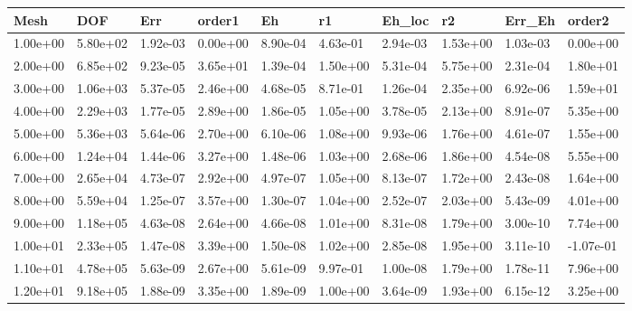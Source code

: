 \begin{tabular}{llllllllll}
Mesh & DOF & Err & order1 & Eh & r1 & Eh_loc & r2 & Err_Eh & order2 \\ 
\hline 
1.00e+00 & 5.80e+02 & 1.92e-03 & 0.00e+00 & 8.90e-04 & 4.63e-01 & 2.94e-03 & 1.53e+00 & 1.03e-03 &  0.00e+00 \\ 
2.00e+00 & 6.85e+02 & 9.23e-05 & 3.65e+01 & 1.39e-04 & 1.50e+00 & 5.31e-04 & 5.75e+00 & 2.31e-04 &  1.80e+01 \\ 
3.00e+00 & 1.06e+03 & 5.37e-05 & 2.46e+00 & 4.68e-05 & 8.71e-01 & 1.26e-04 & 2.35e+00 & 6.92e-06 &  1.59e+01 \\ 
4.00e+00 & 2.29e+03 & 1.77e-05 & 2.89e+00 & 1.86e-05 & 1.05e+00 & 3.78e-05 & 2.13e+00 & 8.91e-07 &  5.35e+00 \\ 
5.00e+00 & 5.36e+03 & 5.64e-06 & 2.70e+00 & 6.10e-06 & 1.08e+00 & 9.93e-06 & 1.76e+00 & 4.61e-07 &  1.55e+00 \\ 
6.00e+00 & 1.24e+04 & 1.44e-06 & 3.27e+00 & 1.48e-06 & 1.03e+00 & 2.68e-06 & 1.86e+00 & 4.54e-08 &  5.55e+00 \\ 
7.00e+00 & 2.65e+04 & 4.73e-07 & 2.92e+00 & 4.97e-07 & 1.05e+00 & 8.13e-07 & 1.72e+00 & 2.43e-08 &  1.64e+00 \\ 
8.00e+00 & 5.59e+04 & 1.25e-07 & 3.57e+00 & 1.30e-07 & 1.04e+00 & 2.52e-07 & 2.03e+00 & 5.43e-09 &  4.01e+00 \\ 
9.00e+00 & 1.18e+05 & 4.63e-08 & 2.64e+00 & 4.66e-08 & 1.01e+00 & 8.31e-08 & 1.79e+00 & 3.00e-10 &  7.74e+00 \\ 
1.00e+01 & 2.33e+05 & 1.47e-08 & 3.39e+00 & 1.50e-08 & 1.02e+00 & 2.85e-08 & 1.95e+00 & 3.11e-10 & -1.07e-01 \\ 
1.10e+01 & 4.78e+05 & 5.63e-09 & 2.67e+00 & 5.61e-09 & 9.97e-01 & 1.00e-08 & 1.79e+00 & 1.78e-11 &  7.96e+00 \\ 
1.20e+01 & 9.18e+05 & 1.88e-09 & 3.35e+00 & 1.89e-09 & 1.00e+00 & 3.64e-09 & 1.93e+00 & 6.15e-12 &  3.25e+00 \\ 
\hline 
\end{tabular}